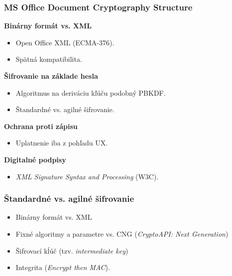 \documentclass[xcolor=dvipsnames]{beamer}
\def\itemtitle#1{{\bfseries#1\smallskip}}
\begin{document}

\begin{frame}
	\frametitle{MS Office Document Cryptography Structure}
	\itemtitle{Binárny formát vs. XML}
	\begin{itemize}
		\item Open Office XML (ECMA-376).
		\item Spätná kompatibilita.
	\end{itemize}
	\bigskip
	\itemtitle{Šifrovanie na základe hesla}
	\begin{itemize}
		\item Algoritmus na deriváciu kľúču podobný PBKDF.
		\item Štandardné vs. agilné šifrovanie.
	\end{itemize}
	\bigskip
	\itemtitle{Ochrana proti zápisu}
	\begin{itemize}
		\item  Uplatnenie iba z pohľadu UX.
	\end{itemize}
	\bigskip
	\itemtitle{Digitalné podpisy}
	\begin{itemize}
		\item  \textit{XML Signature Syntax and Processing} (W3C).
	\end{itemize}


\end{frame}


\begin{frame}
	\frametitle{Štandardné vs. agilné šifrovanie}
	\begin{itemize}
		\item Binárny formát vs. XML
		\item Fixné algoritmy a parametre vs. CNG (\textit{CryptoAPI: Next Generation})
		\item Šifrovací kĺúč (tzv. \textit{intermediate key})
		\item Integrita (\textit{Encrypt then MAC}). 
	\end{itemize}
\end{frame}

\end{document}

